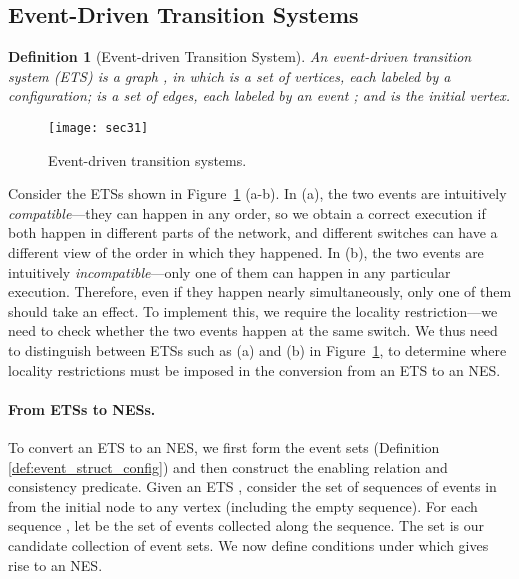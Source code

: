 \documentclass[pldi-cameraready]{sigplanconf}
\newtheorem{definition}{Definition}
\begin{document}
\subsection{Event-Driven Transition Systems}
\label{subsec:ets}
\begin{definition}[Event-driven Transition System]
An {\em event-driven transition system (ETS)} is a graph ,
in which  is a set of vertices, each labeled by a
configuration;  is a
set of edges, each labeled by an event ; 
and  is the initial vertex. 
\end{definition}

\begin{figure}[t]
\centering
\texttt{[image: sec31]}
\caption{Event-driven transition systems.}
\label{fig:ETSs}
\end{figure}


Consider the ETSs shown in Figure~\ref{fig:ETSs} (a-b). In (a), the
two events are intuitively {\em compatible}---they can happen in any order,
so we obtain a correct execution if both happen in different parts of
the network, and different switches can have a different view of the
order in which they happened. In (b), the two events are intuitively
{\em incompatible}---only one of them can happen in any particular
execution. Therefore, even if they happen nearly simultaneously, only
one of them should take an effect.
To implement this, we require the
locality restriction---we need to check whether the two events happen
at the same switch.
We thus need to distinguish between ETSs such as
(a) and (b) in Figure~\ref{fig:ETSs}, to determine where
locality restrictions must be imposed in the conversion from an ETS to
an NES.



\paragraph*{From ETSs to NESs.}
To convert an ETS to an NES, we first form the event sets
(Definition \ref{def:event_struct_config}) and then construct the enabling relation and consistency
predicate.
Given an ETS , consider the
set  of sequences of events in  from the initial node to any
vertex (including the empty sequence). For
each sequence , let  be the set of events collected
along the sequence. The set  is our
candidate collection of event sets.
We now define conditions under which  gives rise to an NES.
\end{document}
